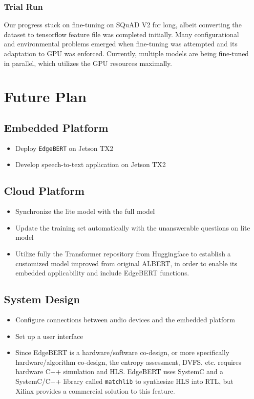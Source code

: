 \documentclass[a4paper]{article}
\begin{document}
\subsubsection{Trial Run}
Our progress stuck on fine-tuning on SQuAD V2 for long, albeit converting the dataset to tensorflow feature file was completed initially. Many configurational and environmental problems emerged when fine-tuning was attempted and its adaptation to GPU was enforced. Currently, multiple models are being fine-tuned in parallel, which utilizes the GPU resources maximally.

\section{Future Plan}
\subsection{Embedded Platform}
\begin{itemize}
    \item Deploy \texttt{EdgeBERT} on Jetson TX2
    \item Develop speech-to-text application on Jetson TX2
\end{itemize}
\subsection{Cloud Platform}
\begin{itemize}
    \item Synchronize the lite model with the full model
    \item Update the training set automatically with the unanswerable questions on lite model
    \item Utilize fully the Transformer repository from Huggingface to establish a customized model improved from original ALBERT, in order to enable its embedded applicability and include EdgeBERT functions.
\end{itemize}
\subsection{System Design}
\begin{itemize}
    \item Configure connections between audio devices and the embedded platform
    \item Set up a user interface
    \item Since EdgeBERT is a hardware/software co-design, or more specifically hardware/algorithm co-design, the entropy assessment, DVFS, etc. requires hardware C++ simulation and HLS. EdgeBERT uses SystemC and a SystemC/C++ library called \texttt{matchlib} to synthesize HLS into RTL, but Xilinx provides a commercial solution to this feature.
\end{itemize}
\printbibliography
\end{document}
